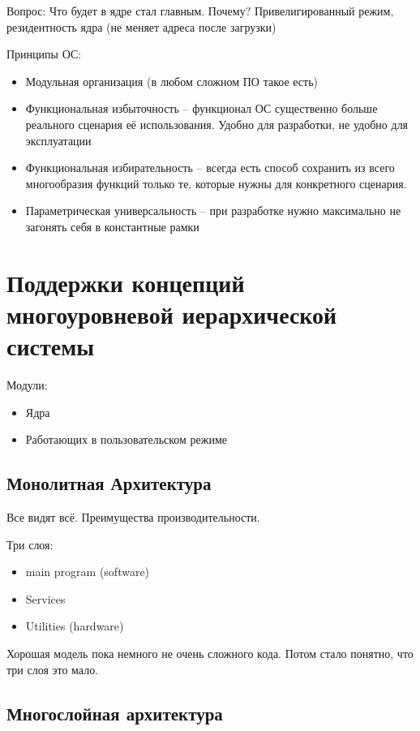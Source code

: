 \documentclass{book}
\theoremstyle{definition}
\begin{document}
    Вопрос: Что будет в ядре стал главным. Почему? Привелигированный режим, резидентность ядра (не меняет адреса после загрузки)

    Принципы ОС:
    \begin{itemize}
        \item Модульная организация (в любом сложном ПО такое есть)
        \item Функциональная избыточность -- функционал ОС существенно больше реального сценария её использования. Удобно для разработки, не удобно для эксплуатации
        \item Функциональная избирательность -- всегда есть способ сохранить из всего многообразия функций только те, которые нужны для конкретного сценария.
        \item Параметрическая универсальность -- при разработке нужно максимально не загонять себя в константные рамки
    \end{itemize}

    \section{Поддержки концепций многоуровневой иерархической системы}

    Модули:
    \begin{itemize}
        \item Ядра
        \item Работающих в пользовательском режиме
    \end{itemize}

    \subsection{Монолитная Архитектура}

    Все видят всё. Преимущества производительности.

    Три слоя:
    \begin{itemize}
        \item main program (software)
        \item Services
        \item Utilities (hardware)
    \end{itemize}

    Хорошая модель пока немного не очень сложного кода. Потом стало понятно, что три слоя это мало.

    \subsection{Многослойная архитектура}
\end{document}
